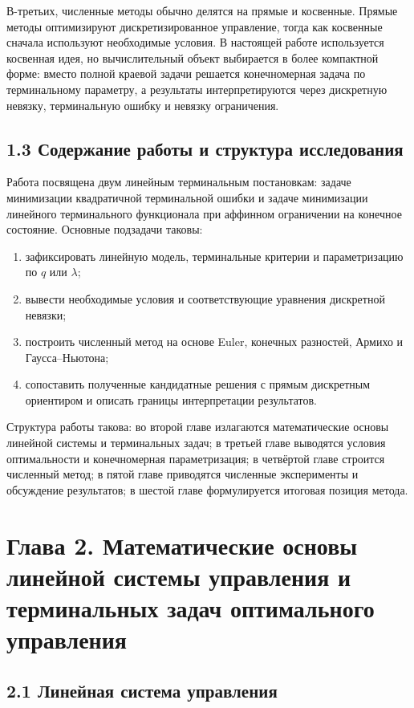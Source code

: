 \documentclass[a4paper,12pt]{article}
\begin{document}
В-третьих, численные методы обычно делятся на прямые и косвенные\cite{betts2010,rao2009,bock1984,hager2000,dontchev2000}. Прямые методы оптимизируют дискретизированное управление, тогда как косвенные сначала используют необходимые условия. В настоящей работе используется косвенная идея, но вычислительный объект выбирается в более компактной форме: вместо полной краевой задачи решается конечномерная задача по терминальному параметру, а результаты интерпретируются через дискретную невязку, терминальную ошибку и невязку ограничения.

\subsection{1.3 Содержание работы и структура исследования}

Работа посвящена двум линейным терминальным постановкам: задаче минимизации квадратичной терминальной ошибки и задаче минимизации линейного терминального функционала при аффинном ограничении на конечное состояние. Основные подзадачи таковы:
\begin{enumerate}
\item зафиксировать линейную модель, терминальные критерии и параметризацию по $q$ или $\lambda$;
\item вывести необходимые условия и соответствующие уравнения дискретной невязки;
\item построить численный метод на основе Euler, конечных разностей, Армихо и Гаусса--Ньютона;
\item сопоставить полученные кандидатные решения с прямым дискретным ориентиром и описать границы интерпретации результатов.
\end{enumerate}

Структура работы такова: во второй главе излагаются математические основы линейной системы и терминальных задач; в третьей главе выводятся условия оптимальности и конечномерная параметризация; в четвёртой главе строится численный метод; в пятой главе приводятся численные эксперименты и обсуждение результатов; в шестой главе формулируется итоговая позиция метода.

\section{Глава 2. Математические основы линейной системы управления и терминальных задач оптимального управления}

\subsection{2.1 Линейная система управления}
\end{document}
